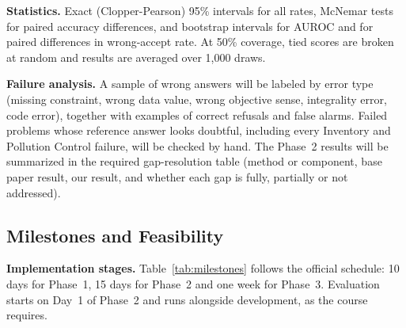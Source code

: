 \documentclass[11pt,a4paper]{article}
\begin{document}
\textbf{Statistics.} Exact (Clopper-Pearson) 95\% intervals for all rates, McNemar tests for paired accuracy differences, and bootstrap intervals for AUROC and for paired differences in wrong-accept rate. At 50\% coverage, tied scores are broken at random and results are averaged over 1,000 draws.

\textbf{Failure analysis.} A sample of wrong answers will be labeled by error type (missing constraint, wrong data value, wrong objective sense, integrality error, code error), together with examples of correct refusals and false alarms. Failed problems whose reference answer looks doubtful, including every Inventory and Pollution Control failure, will be checked by hand. The Phase~2 results will be summarized in the required gap-resolution table (method or component, base paper result, our result, and whether each gap is fully, partially or not addressed).

\subsection{Milestones and Feasibility}

\textbf{Implementation stages.} Table~\ref{tab:milestones} follows the official schedule: 10 days for Phase~1, 15 days for Phase~2 and one week for Phase~3. Evaluation starts on Day~1 of Phase~2 and runs alongside development, as the course requires.
\end{document}
